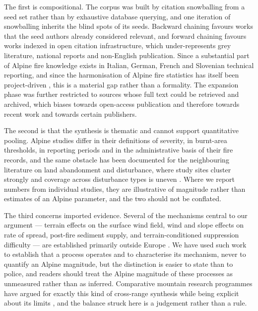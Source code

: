 \documentclass[11pt,a4paper]{article}
\begin{document}
The first is compositional. The corpus was built by citation snowballing from a seed set rather than by exhaustive database querying, and one iteration of snowballing inherits the blind spots of its seeds. Backward chaining favours works that the seed authors already considered relevant, and forward chaining favours works indexed in open citation infrastructure, which under-represents grey literature, national reports and non-English publication. Since a substantial part of Alpine fire knowledge exists in Italian, German, French and Slovenian technical reporting, and since the harmonisation of Alpine fire statistics has itself been project-driven \citep{valese_wildfires_2011, muller_forest_2020}, this is a material gap rather than a formality. The expansion phase was further restricted to sources whose full text could be retrieved and archived, which biases towards open-access publication and therefore towards recent work and towards certain publishers.

The second is that the synthesis is thematic and cannot support quantitative pooling. Alpine studies differ in their definitions of severity, in burnt-area thresholds, in reporting periods and in the administrative basis of their fire records, and the same obstacle has been documented for the neighbouring literature on land abandonment and disturbance, where study sites cluster strongly and coverage across disturbance types is uneven \citep{mantero_influence_2020}. Where we report numbers from individual studies, they are illustrative of magnitude rather than estimates of an Alpine parameter, and the two should not be conflated.

The third concerns imported evidence. Several of the mechanisms central to our argument --- terrain effects on the surface wind field, wind and slope effects on rate of spread, post-fire sediment supply, and terrain-conditioned suppression difficulty --- are established primarily outside Europe \citep{sharples_overview_2009, hayajneh_wind_2026, morell_sediment_2021, cardil_assessing_2025}. We have used such work to establish that a process operates and to characterise its mechanism, never to quantify an Alpine magnitude, but the distinction is easier to state than to police, and readers should treat the Alpine magnitude of these processes as unmeasured rather than as inferred. Comparative mountain research programmes have argued for exactly this kind of cross-range synthesis while being explicit about its limits \citep{payne_nature_2020}, and the balance struck here is a judgement rather than a rule.
\end{document}
